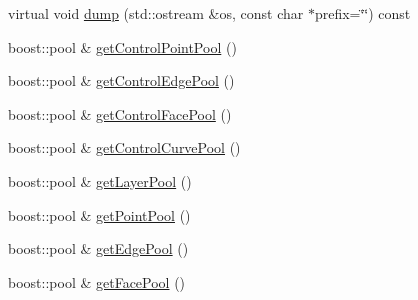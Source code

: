 \begin{DoxyCompactItemize}
\item 
virtual void \hyperlink{classShipCAD_1_1SubdivisionSurface_a6ed961bbb7ca5fe94ec5566109d9b015}{dump} (std\-::ostream \&os, const char $\ast$prefix=\char`\"{}\char`\"{}) const 
\item 
boost\-::pool \& \hyperlink{classShipCAD_1_1SubdivisionSurface_a49109b80a26f29ad52ac109574cf4d5a}{get\-Control\-Point\-Pool} ()
\item 
boost\-::pool \& \hyperlink{classShipCAD_1_1SubdivisionSurface_aa9ed4c00847b5c04f99b27f754df481b}{get\-Control\-Edge\-Pool} ()
\item 
boost\-::pool \& \hyperlink{classShipCAD_1_1SubdivisionSurface_ab9199097e998971add79f7dccbd262c3}{get\-Control\-Face\-Pool} ()
\item 
boost\-::pool \& \hyperlink{classShipCAD_1_1SubdivisionSurface_a647c0e4a20cfd823cc578431c2799c04}{get\-Control\-Curve\-Pool} ()
\item 
boost\-::pool \& \hyperlink{classShipCAD_1_1SubdivisionSurface_a7e80bac4f91557a620fc1843f77b9953}{get\-Layer\-Pool} ()
\item 
boost\-::pool \& \hyperlink{classShipCAD_1_1SubdivisionSurface_a8a8dbbc32fcdc5a08c462cd86c224649}{get\-Point\-Pool} ()
\item 
boost\-::pool \& \hyperlink{classShipCAD_1_1SubdivisionSurface_a2bffb2bf9575d934e18ed5087f8d2996}{get\-Edge\-Pool} ()
\item 
boost\-::pool \& \hyperlink{classShipCAD_1_1SubdivisionSurface_a3fcdae8e54e98938de00dfa4229d8aa8}{get\-Face\-Pool} ()
\end{DoxyCompactItemize}

